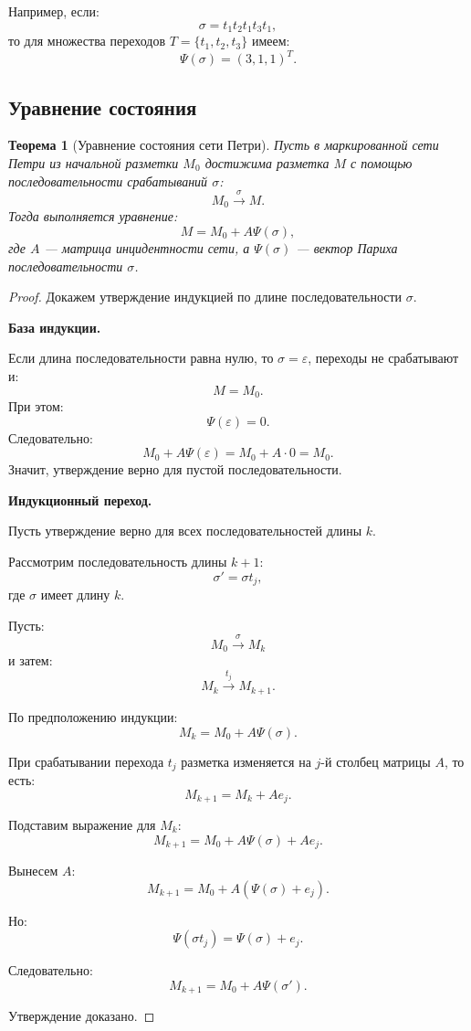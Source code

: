 \documentclass[12pt,a4paper]{article}
\newtheorem{theorem}{Теорема}
\begin{document}
Например, если:
\[
\sigma = t_1t_2t_1t_3t_1,
\]
то для множества переходов $T=\{t_1,t_2,t_3\}$ имеем:
\[
\Psi(\sigma) = (3,1,1)^T.
\]

\subsection{Уравнение состояния}

\begin{theorem}[Уравнение состояния сети Петри]
Пусть в маркированной сети Петри из начальной разметки $M_0$ достижима разметка $M$ с помощью последовательности срабатываний $\sigma$:
\[
M_0 \xrightarrow{\sigma} M.
\]
Тогда выполняется уравнение:
\[
M = M_0 + A \Psi(\sigma),
\]
где $A$ --- матрица инцидентности сети, а $\Psi(\sigma)$ --- вектор Париха последовательности $\sigma$.
\end{theorem}

\begin{proof}
Докажем утверждение индукцией по длине последовательности $\sigma$.

\textbf{База индукции.}

Если длина последовательности равна нулю, то $\sigma = \varepsilon$, переходы не срабатывают и:
\[
M = M_0.
\]
При этом:
\[
\Psi(\varepsilon) = 0.
\]
Следовательно:
\[
M_0 + A\Psi(\varepsilon)
=
M_0 + A \cdot 0
=
M_0.
\]
Значит, утверждение верно для пустой последовательности.

\textbf{Индукционный переход.}

Пусть утверждение верно для всех последовательностей длины $k$.

Рассмотрим последовательность длины $k+1$:
\[
\sigma' = \sigma t_j,
\]
где $\sigma$ имеет длину $k$.

Пусть:
\[
M_0 \xrightarrow{\sigma} M_k
\]
и затем:
\[
M_k \xrightarrow{t_j} M_{k+1}.
\]

По предположению индукции:
\[
M_k = M_0 + A\Psi(\sigma).
\]

При срабатывании перехода $t_j$ разметка изменяется на $j$-й столбец матрицы $A$, то есть:
\[
M_{k+1} = M_k + A e_j.
\]

Подставим выражение для $M_k$:
\[
M_{k+1}
=
M_0 + A\Psi(\sigma) + A e_j.
\]

Вынесем $A$:
\[
M_{k+1}
=
M_0 + A(\Psi(\sigma)+e_j).
\]

Но:
\[
\Psi(\sigma t_j) = \Psi(\sigma)+e_j.
\]

Следовательно:
\[
M_{k+1}
=
M_0 + A\Psi(\sigma').
\]

Утверждение доказано.
\end{proof}
\end{document}
